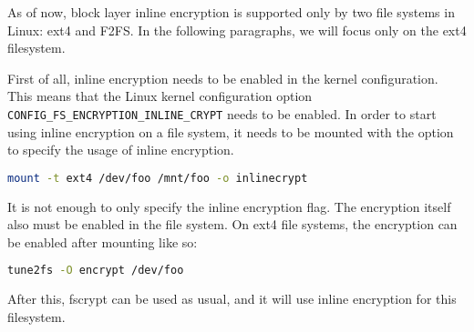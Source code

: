 As of now, block layer inline encryption is supported only by two file systems in Linux: ext4 and F2FS. 
In the following paragraphs, we will focus only on the ext4 filesystem.

First of all, inline encryption needs to be enabled in the kernel configuration. This means that the Linux kernel configuration option \verb|CONFIG_FS_ENCRYPTION_INLINE_CRYPT| needs to be enabled.
In order to start using inline encryption on a file system, it needs to be mounted with the option to specify the usage of inline encryption.
\begin{lstlisting}[language=bash]
mount -t ext4 /dev/foo /mnt/foo -o inlinecrypt
\end{lstlisting}
It is not enough to only specify the inline encryption flag. The encryption itself also must be enabled in the file system. On ext4 file systems, the encryption can be enabled after mounting like so:
\begin{lstlisting}[language=bash]
tune2fs -O encrypt /dev/foo
\end{lstlisting}
After this, fscrypt can be used as usual, and it will use inline encryption for this filesystem.








